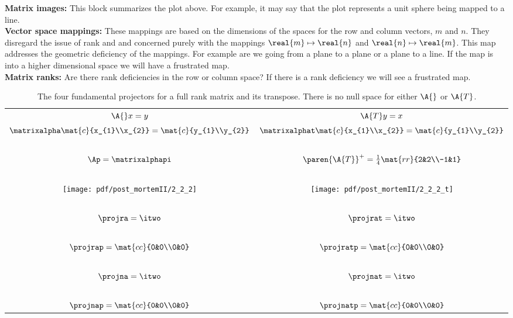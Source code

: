 \textbf{Matrix images:} This block summarizes the plot above. For example, it may say that the plot represents a unit sphere being mapped to a line.\\

\textbf{Vector space mappings:} These mappings are based on the dimensions of the spaces for the row and column vectors, $m$ and $n$. They disregard the issue of rank and and concerned purely with the mappings $\real{m}\mapsto\real{n}$ and  $\real{n}\mapsto\real{m}$. This map addresses the geometric deficiency of the mappings. For example are we going from a plane to a plane or a plane to a line. If the map is into a higher dimensional space we will have a frustrated map.\\

\textbf{Matrix ranks:} Are there rank deficiencies in the row or column space? If there is a rank deficiency we will see a frustrated map. 


\clearpage

\begin{table}[htdp]
\begin{center}
\begin{tabular}{cc}
  $\A{}x=y$ & $\A{T}y=x$\\
$\matrixalpha  \mat{c}{x_{1}\\x_{2}} = \mat{c}{y_{1}\\y_{2}}$ &
$\matrixalphat \mat{c}{x_{1}\\x_{2}} = \mat{c}{y_{1}\\y_{2}}$ \\
\ \\
 $\Ap = \matrixalphapi$ & $\paren{\A{T}}^{+} = \frac{1}{4}\mat{rr}{2&2\\-1&1}$ \\
\ \\
\texttt{[image: pdf/post\_mortemII/2\_2\_2]} &
\texttt{[image: pdf/post\_mortemII/2\_2\_2\_t]} \\
\ \\
 $\projra = \itwo$ & $\projrat = \itwo$ \\
\ \\
 $\projrap = \mat{cc}{0&0\\0&0}$ & $\projratp = \mat{cc}{0&0\\0&0}$ \\
\ \\
 $\projna = \itwo$ & $\projnat = \itwo$ \\
\ \\
 $\projnap = \mat{cc}{0&0\\0&0}$ & $\projnatp = \mat{cc}{0&0\\0&0}$ \\
\end{tabular}
\end{center}
\label{tab:proj:a}
\caption[The four fundamental projectors for a full rank matrix and its transpose]{The four fundamental projectors for a full rank matrix and its transpose. There is no null space for either $\A{}$ or $\A{T}$.}
\end{table}%

